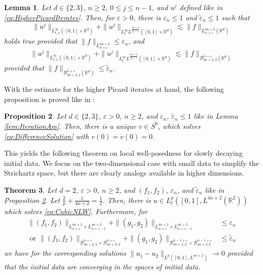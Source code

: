 \documentclass{amsart}
\newtheorem{theorem}{Theorem}[section]
\newtheorem{lemma}[theorem]{Lemma}
\newtheorem{proposition}[theorem]{Proposition}
\theoremstyle{definition}
\newcommand{\R}{\mathbb{R}}
\numberwithin{equation}{section}
\begin{document}
{\begin{lemma}
Let $d \in \{ 2, 3 \}$, $n \geq 2$, $0 \leq j \leq n-1$, and $u^j$ defined like in \eqref{eq:HigherPicardIterates}. Then, for $\varepsilon >0$, there is $\varepsilon_n \leq 1$ and $\tilde{\varepsilon}_n \leq 1$ such that
\begin{equation*}
\| u^j \|_{L^\infty_{t,x}([0,1] \times \R^d)} + \| u^j \|_{L_t^\infty L^{\frac{4n+2}{2j+1}}([0,1] \times \R^d)} \lesssim \| f \|_{L^{4n+2}_{\alpha + \varepsilon}(\R^d)}
\end{equation*}
holds true provided that $\| f \|_{L^{4n+2}_{\alpha + \varepsilon}} \leq \varepsilon_n$, and
\begin{equation*}
\| u^j \|_{L^\infty_{t,x}([0,1] \times \R^d)} + \| u^j \|_{L^\infty_t L^{\frac{4n+2}{2j+1}}([0,1] \times \R^d)} \lesssim \| f \|_{\mathcal{B}^{\tilde{\alpha}+\varepsilon}_{4n+2,2}(\R^d)}
\end{equation*}
provided that $\| f \|_{\mathcal{B}^{\tilde{\alpha}+\varepsilon}_{4n+2,2}(\R^d)} \leq \tilde{\varepsilon}_n$.
\end{lemma}

With the estimate for the higher Picard iterates at hand, the following proposition is proved like in \cite[Proposition~4.6]{Schippa2022}:
\begin{proposition}
\label{prop:ExistenceDifferenceSolution}
Let $d \in \{2,3\}$, $\varepsilon > 0$, $n \geq 2$, and $\varepsilon_n$, $\tilde{\varepsilon}_n \leq 1$ like in Lemma \ref{lem:IterationAm}. Then, there is a unique $v \in S^0$, which solves \eqref{eq:DifferenceSolution} with $v(0) = \dot{v}(0) = 0$.
\end{proposition}
This yields the following theorem on local well-posedness for slowly decaying initial data. We focus on the two-dimensional case with small data to simplify the Strichartz space, but there are clearly analogs available in higher dimensions.
\begin{theorem}
\label{thm:SlowlyDecayingData}
Let $d=2$, $\varepsilon > 0$, $n \geq 2$, and $(f_1,f_2)$, $\varepsilon_n$, and $\tilde{\varepsilon}_n$ like in Proposition \ref{prop:ExistenceDifferenceSolution}. Let $\frac{2}{p} + \frac{1}{4n+2} = \frac{1}{2}$. Then, there is $u \in L_t^p([0,1],L^{4n+2}(\R^2))$ which solves \eqref{eq:CubicNLW}. Furthermore, for 
\begin{align*}
\| (f_1,f_2) \|_{L^{4n+2}_{\alpha+\varepsilon} \times L^{4n+2}_{\alpha + \varepsilon -1}} + \| (g_1,g_2) \|_{L^{4n+2}_{\alpha+\varepsilon} \times L^{4n+2}_{\alpha + \varepsilon -1}} &\leq \varepsilon_n \\
\text{ or } 
\| (f_1,f_2) \|_{\mathcal{B}^{\tilde{\alpha}+\varepsilon}_{4n+2,2} \times \mathcal{B}^{\tilde{\alpha}+\varepsilon}_{4n+2,2}} + \| (g_1,g_2) \|_{\mathcal{B}^{\tilde{\alpha}-1+\varepsilon}_{4n+2,2} \times \mathcal{B}^{\tilde{\alpha}-1+\varepsilon}_{4n+2,2}} &\leq \tilde{\varepsilon}_n
\end{align*}
we have for the corresponding solutions $\| u_1 - u_2 \|_{L^p([0,1],L^{4n+2})} \to 0$ provided that the initial data are converging in the spaces of initial data.
\end{theorem}
}
\end{document}
